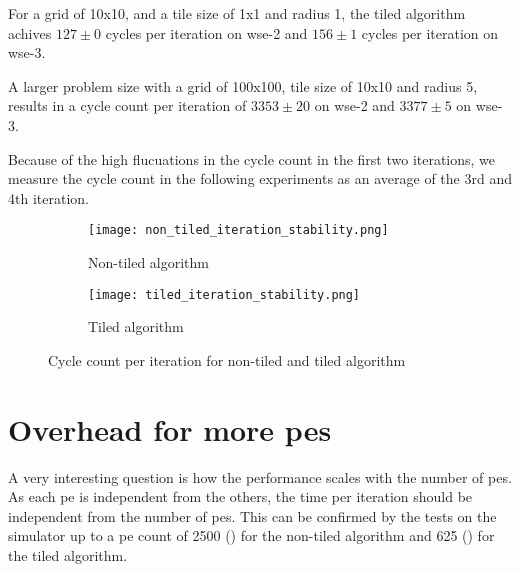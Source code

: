 For a grid of 10x10, and a tile size of 1x1 and radius 1, the tiled algorithm achives $127\pm0$ cycles per iteration on \ac{wse}-2 and $156\pm1$ cycles per iteration on \ac{wse}-3.

A larger problem size with a grid of 100x100, tile size of 10x10 and radius 5, results in a cycle count per iteration of $3353\pm20$ on \ac{wse}-2 and $3377\pm5$ on \ac{wse}-3.

Because of the high flucuations in the cycle count in the first two iterations, we measure the cycle count in the following experiments as an average of the 3rd and 4th iteration.

\begin{figure}[h]
    \centering
    \begin{subfigure}[b]{0.48\textwidth}
        \centering
        \texttt{[image: non\_tiled\_iteration\_stability.png]}
        \caption{Non-tiled algorithm}
        \label{fig:non_tiled_iteration_stability}
    \end{subfigure}
    \hfill
    \begin{subfigure}[b]{0.48\textwidth}
        \centering
        \texttt{[image: tiled\_iteration\_stability.png]}
        \caption{Tiled algorithm}
        \label{fig:tiled_iteration_stability}
    \end{subfigure}
    \caption{Cycle count per iteration for non-tiled and tiled algorithm}
    \label{fig:iteration_stability}
\end{figure}



\section{Overhead for more \acp{pe}}
\label{sec:pe_overhead}
A very interesting question is how the performance scales with the number of \acp{pe}.
As each \ac{pe} is independent from the others, the time per iteration should be independent from the number of \acp{pe}.
This can be confirmed by the tests on the simulator up to a \ac{pe} count of \num{2500} () for the non-tiled algorithm and \num{625} () for the tiled algorithm.

